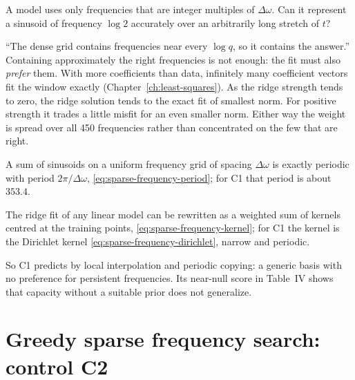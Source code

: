 \begin{checkpoint}
A model uses only frequencies that are integer multiples of $\Delta\omega$. Can it represent a sinusoid of frequency $\log2$ accurately over an arbitrarily long stretch of $t$?
\end{checkpoint}

\begin{pitfall}
``The dense grid contains frequencies near every $\log q$, so it contains the answer.'' Containing approximately the right frequencies is not enough: the fit must also \emph{prefer} them. With more coefficients than data, infinitely many coefficient vectors fit the window exactly (Chapter~\ref{ch:least-squares}). As the ridge strength tends to zero, the ridge solution tends to the exact fit of smallest norm. For positive strength it trades a little misfit for an even smaller norm. Either way the weight is spread over all 450 frequencies rather than concentrated on the few that are right.
\end{pitfall}

\begin{keyideas}
\item A sum of sinusoids on a uniform frequency grid of spacing $\Delta\omega$ is exactly periodic with period $2\pi/\Delta\omega$, \eqref{eq:sparse-frequency-period}; for C1 that period is about $353.4$.
\item The ridge fit of any linear model can be rewritten as a weighted sum of kernels centred at the training points, \eqref{eq:sparse-frequency-kernel}; for C1 the kernel is the Dirichlet kernel \eqref{eq:sparse-frequency-dirichlet}, narrow and periodic.
\item So C1 predicts by local interpolation and periodic copying: a generic basis with no preference for persistent frequencies. Its near-null score in Table~IV shows that capacity without a suitable prior does not generalize.
\end{keyideas}

\section{Greedy sparse frequency search: control C2}\label{sec:sparse-frequency-greedy}

